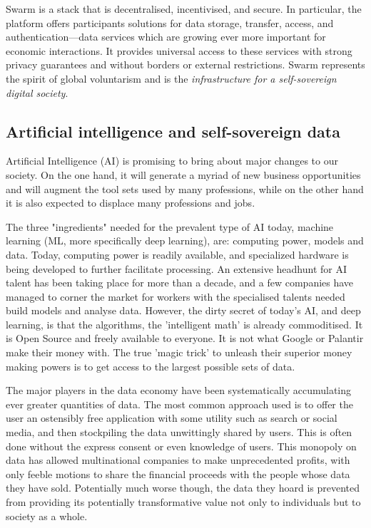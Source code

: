 Swarm is a  stack that is decentralised, incentivised, and secure. In particular, the platform offers participants solutions for data storage, transfer, access, and authentication—data services which are growing ever more important for economic interactions. It provides universal access to these services with strong privacy guarantees and without borders or external restrictions. Swarm represents the spirit of global voluntarism and is the \emph{infrastructure for a self-sovereign digital society}.

\subsection{Artificial intelligence and self-sovereign data \statusgreen} \label{sec:AIdata}

Artificial Intelligence (AI) is promising to bring about major changes to our society. On the one hand, it will generate a myriad of new business opportunities and will augment the tool sets used by many professions, while on the other hand it is also expected to displace many professions and jobs\cite{Lee2018Sep}.

The three "ingredients" needed for the prevalent type of AI today, machine learning (ML, more specifically deep learning), are: computing power, models and data. Today, computing power is readily available, and specialized hardware is being developed to further facilitate processing. An extensive headhunt for AI talent has been taking place for more than a decade, and a few companies have managed to corner the market for workers with the specialised talents needed build models and analyse data. However, the dirty secret of today's AI, and deep learning, is that the algorithms, the 'intelligent math' is already commoditised. It is Open Source and freely available to everyone. It is not what Google or Palantir make their money with. The true 'magic trick' to unleash their superior money making powers is to get access to the largest possible sets of data.

The major players in the data economy have been systematically accumulating ever greater quantities of data.  The most common approach used is to offer the user an ostensibly free application with some utility such as search or social media, and then stockpiling the data unwittingly shared by users. This is often done without the express consent or even knowledge of users. This monopoly on data has allowed multinational companies to make unprecedented profits, with only feeble motions to share the financial proceeds with the people whose data they have sold. Potentially much worse though, the data they hoard is prevented from providing its potentially transformative value not only to individuals but to society as a whole.

